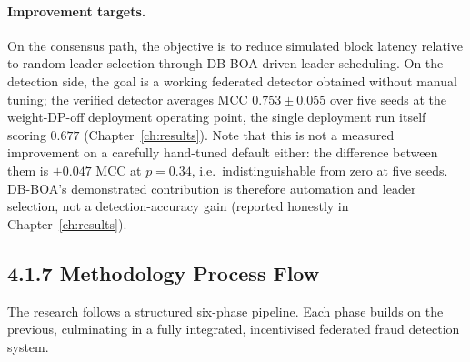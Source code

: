 \paragraph{Improvement targets.}
On the consensus path, the objective is to reduce simulated block latency relative to random leader selection through DB-BOA-driven leader scheduling. On the detection side, the goal is a working federated detector obtained without manual tuning; the verified detector averages MCC $0.753 \pm 0.055$ over five seeds at the weight-DP-off deployment operating point, the single deployment run itself scoring $0.677$ (Chapter~\ref{ch:results}). Note that this is not a measured improvement on a carefully hand-tuned default either: the difference between them is $+0.047$ MCC at $p=0.34$, i.e.\ indistinguishable from zero at five seeds. DB-BOA's demonstrated contribution is therefore automation and leader selection, not a detection-accuracy gain (reported honestly in Chapter~\ref{ch:results}).

\subsection*{4.1.7 Methodology Process Flow}

The research follows a structured six-phase pipeline. Each phase builds on the previous, culminating in a fully integrated, incentivised federated fraud detection system.

